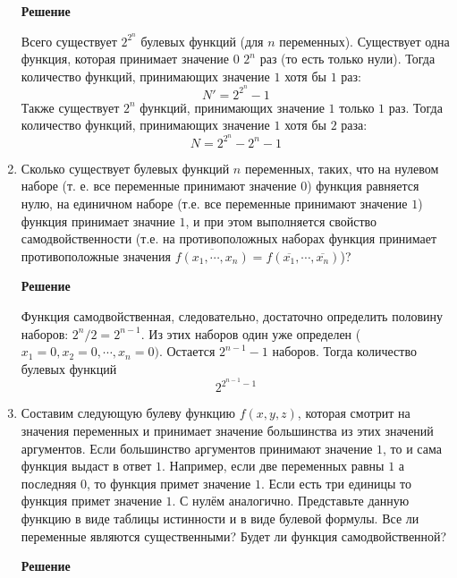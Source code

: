 \documentclass[12pt]{article}
\begin{document}
\begin{enumerate}[label={\textbf{\arabic{section}.\arabic*}}]
		\textbf{Решение}
		
		Всего существует $2^{2^n}$ булевых функций (для $n$ переменных). Существует одна функция, которая принимает значение $0$ $2^n$ раз (то есть только нули). Тогда количество функций, принимающих значение $1$ хотя бы $1$ раз:
		$$
		N' = 2^{2^n} - 1
		$$  
		Также существует $2^n$ функций, принимающих значение $1$ только $1$ раз. Тогда количество функций, принимающих значение $1$ хотя бы $2$ раза:
		$$
		N = 2^{2^n} - 2^n - 1
		$$
		
		\item Сколько существует булевых функций $n$ переменных, таких, что на нулевом наборе (т. е. все переменные принимают значение $0$) функция равняется нулю, на единичном наборе (т.е. все переменные принимают значение $1$) функция принимает значние $1$, и при этом выполняется свойство самодвойственности (т.е. на противоположных наборах функция принимает противоположные значения $\overline{f(x_1,\cdots,x_n)}=f(\overline{x_1},\cdots,\overline{x_n})$)?
		
		\textbf{Решение}
		
		Функция самодвойственная, следовательно, достаточно определить половину наборов: ${2^n}/2 = 2^{n-1}$. Из этих наборов один уже определен ($x_1=0,x_2=0,\cdots,x_n=0)$. Остается $2^{n-1} - 1$ наборов. Тогда количество булевых функций 
		$$
		2^{2^{n-1} - 1}
		$$
		\item Составим следующую булеву функцию $f(x,y,z)$, которая смотрит на значения переменных и принимает значение большинства из этих значений аргументов. Если большинство аргументов принимают значение $1$, то и сама функция выдаст в ответ $1$. Например, если две переменных равны $1$ а последняя $0$, то функция примет значение $1$. Если есть три единицы то функция примет значение $1$. С нулём аналогично. Представьте данную функцию в виде таблицы истинности и в виде булевой формулы. Все ли переменные являются существенными? Будет ли функция самодвойственной?
		
		\textbf{Решение}
		

\end{enumerate}
\end{document}
